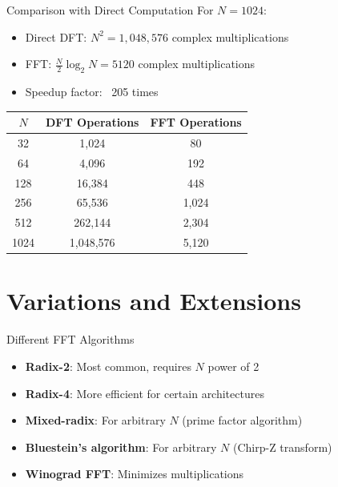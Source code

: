 \documentclass{beamer}
\begin{document}
\begin{frame}{Comparison with Direct Computation}
  For $N = 1024$:
  \begin{itemize}
  \item Direct DFT: $N^2 = 1,048,576$ complex multiplications
  \item FFT: $\frac{N}{2} \log_2 N = 5120$ complex multiplications
  \item Speedup factor: ~205 times
  \end{itemize}
  \begin{center}
    \begin{tabular}{|c|c|c|}
      \hline
      $N$ & DFT Operations & FFT Operations \\
      \hline
      32 & 1,024 & 80 \\
      64 & 4,096 & 192 \\
      128 & 16,384 & 448 \\
      256 & 65,536 & 1,024 \\
      512 & 262,144 & 2,304 \\
      1024 & 1,048,576 & 5,120 \\
      \hline
    \end{tabular}
  \end{center}
\end{frame}

\section{Variations and Extensions}

\begin{frame}{Different FFT Algorithms}
  \begin{itemize}
  \item \textbf{Radix-2}: Most common, requires $N$ power of 2
  \item \textbf{Radix-4}: More efficient for certain architectures
  \item \textbf{Mixed-radix}: For arbitrary $N$ (prime factor algorithm)
  \item \textbf{Bluestein's algorithm}: For arbitrary $N$ (Chirp-Z transform)
  \item \textbf{Winograd FFT}: Minimizes multiplications
  \end{itemize}
\end{frame}
\end{document}
